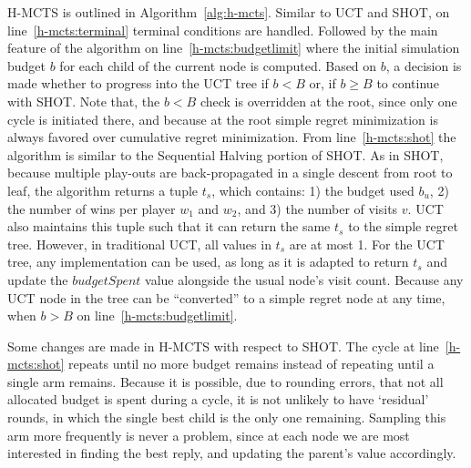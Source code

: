 \documentclass{kecsmstr}
\begin{document}
H-MCTS is outlined in Algorithm~\ref{alg:h-mcts}. Similar to UCT and SHOT, on line~\ref{h-mcts:terminal} terminal conditions are handled. Followed by the main feature of the algorithm on line~\ref{h-mcts:budgetlimit} where the initial simulation budget $b$ for each child of the current node is computed. Based on $b$, a decision is made whether to progress into the UCT tree if $b<B$ or, if $b \geq B$ to continue with SHOT. Note that, the $b<B$ check is overridden at the root, since only one cycle is initiated there, and because at the root simple regret minimization is always favored over cumulative regret minimization. From line~\ref{h-mcts:shot} the algorithm is similar to the Sequential Halving portion of SHOT. As in SHOT, because multiple play-outs are back-propagated in a single descent from root to leaf, the algorithm returns a tuple $t_s$, which contains: 1) the budget used $b_u$, 2) the number of wins per player $w_1$ and $w_2$, and 3) the number of visits $v$. UCT also maintains this tuple such that it can return the same $t_s$ to the simple regret tree. However, in traditional UCT, all values in $t_s$ are at most 1. For the UCT tree, any implementation can be used, as long as it is adapted to return $t_s$ and update the $budgetSpent$ value alongside the usual node's visit count. Because any UCT node in the tree can be ``converted'' to a simple regret node at any time, when $b>B$ on line~\ref{h-mcts:budgetlimit}. 

Some changes are made in H-MCTS with respect to SHOT. The cycle at line~\ref{h-mcts:shot} repeats until no more budget remains instead of repeating until a single arm remains. Because it is possible, due to rounding errors, that not all allocated budget is spent during a cycle, it is not unlikely to have `residual' rounds, in which the single best child is the only one remaining. Sampling this arm more frequently is never a problem, since at each node we are most interested in finding the best reply, and updating the parent's value accordingly.
\end{document}
